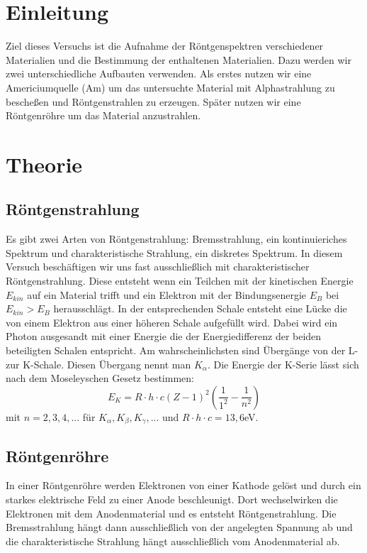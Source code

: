 \documentclass[a4paper,14pt]{article}
\begin{document}
\section{Einleitung}
Ziel dieses Versuchs ist die Aufnahme der Röntgenspektren verschiedener Materialien und die Bestimmung der enthaltenen Materialien. Dazu werden wir zwei unterschiedliche Aufbauten verwenden. Als erstes nutzen wir eine Americiumquelle (Am) um das untersuchte Material mit Alphastrahlung zu bescheßen und Röntgenstrahlen zu erzeugen. Später nutzen wir eine Röntgenröhre um das Material anzustrahlen.

\section{Theorie}
\subsection{Röntgenstrahlung}
Es gibt zwei Arten von Röntgenstrahlung: Bremsstrahlung, ein kontinuieriches Spektrum und charakteristische Strahlung, ein diskretes Spektrum.
In diesem Versuch beschäftigen wir uns fast ausschließlich mit charakteristischer Röntgenstrahlung. Diese entsteht wenn ein Teilchen mit der kinetischen Energie $E_{kin}$ auf ein Material trifft und ein Elektron mit der Bindungsenergie $E_B$ bei $E_{kin} > E_B$ herausschlägt. In der entsprechenden Schale entsteht eine Lücke die von einem Elektron aus einer höheren Schale aufgefüllt wird. Dabei wird ein Photon ausgesandt mit einer Energie die der Energiedifferenz der beiden beteiligten Schalen entspricht. Am wahrscheinlichsten sind Übergänge von der L- zur K-Schale. Diesen Übergang nennt man $K_\alpha$.
Die Energie der K-Serie lässt sich nach dem Moseleyschen Gesetz bestimmen:
\begin{equation}
	E_K = R \cdot h \cdot c (Z-1)^2 (\frac{1}{1^2} - \frac{1}{n^2})
\end{equation}
mit $n = 2,3,4,...$ für $K_\alpha, K_\beta, K_\gamma, ...$ und $R \cdot h \cdot c = 13,6$eV.

\subsection{Röntgenröhre}
In einer Röntgenröhre werden Elektronen von einer Kathode gelöst und durch ein starkes elektrische Feld zu einer Anode beschleunigt. Dort wechselwirken die Elektronen mit dem Anodenmaterial und es entsteht Röntgenstrahlung. Die Bremsstrahlung hängt dann ausschließlich von der angelegten Spannung ab und die charakteristische Strahlung hängt ausschließlich vom Anodenmaterial ab.
\end{document}
